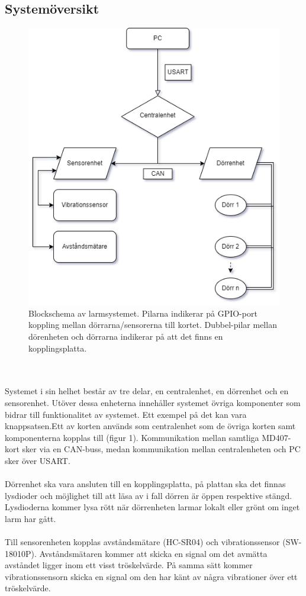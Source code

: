 \documentclass{article}
\begin{document}
\subsection{Systemöversikt}
\begin{figure}[h]
    \centering
    \includegraphics[scale=0.6]{Projektrapport/diagram.png}
    \caption {Blockschema av larmsystemet. Pilarna indikerar på GPIO-port koppling mellan dörrarna/sensorerna till kortet. Dubbel-pilar mellan dörenheten och dörrarna indikerar på att det finns en kopplingsplatta.}
    \label{fig:drawing}
\end{figure}
\\
\\
\noindent
Systemet i sin helhet består av tre delar, en centralenhet, en dörrenhet och en sensorenhet. Utöver dessa enheterna innehåller systemet övriga komponenter som bidrar till funktionalitet av systemet. Ett exempel på det kan vara knappsatsen.Ett av korten används som centralenhet som de övriga korten samt komponenterna kopplas till (figur 1). Kommunikation mellan samtliga MD407-kort sker via en CAN-buss, medan kommunikation mellan centralenheten och PC sker över USART.
\\
\newpage
\\
\noindent
Dörrenhet ska vara ansluten till en kopplingsplatta, på plattan ska det finnas lysdioder och möjlighet till att läsa av i fall dörren är öppen respektive stängd.
Lysdioderna kommer lysa rött när dörrenheten larmar lokalt eller grönt om inget larm har gått.
\\
\\
Till sensorenheten kopplas avståndsmätare (HC-SR04) och vibrationssensor (SW-18010P).
Avståndsmätaren kommer att skicka en signal om det avmätta avståndet ligger inom ett visst tröskelvärde.
På samma sätt kommer vibrationssensorn skicka en signal om den har känt av några vibrationer över ett tröskelvärde.
\end{document}
